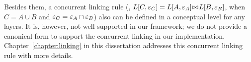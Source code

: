 Besides them, 
a concurrent linking rule (\ie, $L[C, {\varepsilon}_C] = {L[A, {\varepsilon}_A]} \!\bowtie\! {L[B, {\varepsilon}_B]}$, when $C = A \cup B$ and ${\varepsilon}_C = {\varepsilon}_A \cap {\varepsilon}_B$)  
also can be defined in a conceptual level for any layers.
It is, however, not well supported in our framework; we do not provide
a canonical form to support the concurrent linking
in our implementation.
Chapter~\ref{chapter:linking} in this dissertation addresses this concurrent linking rule with more details.






